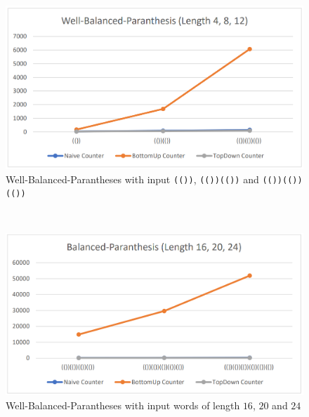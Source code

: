 \documentclass[a4paper, 11pt]{article}
\begin{document}
\begin{minipage}{0.45\textwidth}

\begin{figure}[H]
\begin{center}
\includegraphics[scale=0.28]{diagrams/BP_1.png} 
\caption{Well-Balanced-Parantheses with input \texttt{(())}, \texttt{(())(())} and \texttt{(())(())(())}}
\end{center}

\end{figure}

\end{minipage}\begin{minipage}{0.1\textwidth}
\ 
\end{minipage}\begin{minipage}{0.45\textwidth}

\begin{figure}[H]
\begin{center}
\includegraphics[scale=0.28]{diagrams/BP_2.png}
\caption{Well-Balanced-Parantheses with input words of length $16$, $20$ and $24$ \\ \ }
\end{center}

\end{figure}

\end{minipage}
\end{document}
